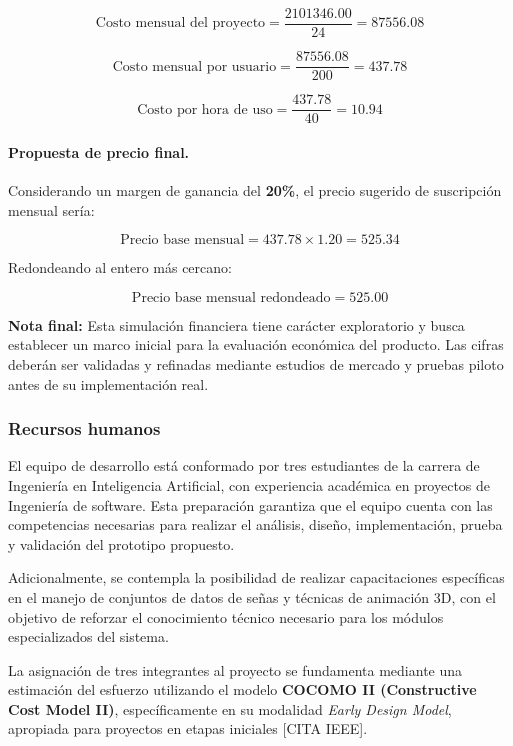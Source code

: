\[
\text{Costo mensual del proyecto} = \frac{\num{2101346.00}}{24} = \num{87556.08}
\]

\[
\text{Costo mensual por usuario} = \frac{\num{87556.08}}{200} = \num{437.78}
\]

\[
\text{Costo por hora de uso} = \frac{\num{437.78}}{40} = \num{10.94}
\]

\paragraph{\textbf{Propuesta de precio final.}}
Considerando un margen de ganancia del \textbf{20\%}, el precio sugerido de suscripción mensual sería:

\[
\text{Precio base mensual} = \num{437.78} \times 1.20 = \num{525.34}
\]

Redondeando al entero más cercano:

\[
\text{Precio base mensual redondeado} = \num{525.00}
\]

\begin{flushleft}
	\textbf{Nota final:} Esta simulación financiera tiene carácter exploratorio y busca establecer un marco inicial para la evaluación económica del producto. Las cifras deberán ser validadas y refinadas mediante estudios de mercado y pruebas piloto antes de su implementación real.
\end{flushleft}



\subsubsection{Recursos humanos}
El equipo de desarrollo está conformado por tres estudiantes de la carrera de Ingeniería en Inteligencia Artificial, con experiencia académica en proyectos de Ingeniería de software. Esta preparación garantiza que el equipo cuenta con las competencias necesarias para realizar el análisis, diseño, implementación, prueba y validación del prototipo propuesto.

Adicionalmente, se contempla la posibilidad de realizar capacitaciones específicas en el manejo de conjuntos de datos de señas y técnicas de animación 3D, con el objetivo de reforzar el conocimiento técnico necesario para los módulos especializados del sistema.

La asignación de tres integrantes al proyecto se fundamenta mediante una estimación del esfuerzo utilizando el modelo \textbf{COCOMO II (Constructive Cost Model II)}, específicamente en su modalidad \textit{Early Design Model}, apropiada para proyectos en etapas iniciales [CITA IEEE].

